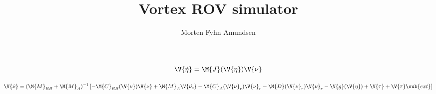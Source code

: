 \documentclass[a4paper]{article}
\title{Vortex ROV simulator}
\author{Morten Fyhn Amundsen}
\begin{document}
\maketitle

\begin{equation}
	\V{\dot{\eta}}
	=
	\M{J}(\V{\eta})
	\V{\nu}
\end{equation}

\begin{equation}
	\V{\dot{\nu}}
	=
	(\M{M}_{RB} + \M{M}_A)^{-1}
	\left[
		-
		\M{C}_{RB}(\V{\nu})\V{\nu}
		+
		\M{M}_A \V{\dot{\nu_c}}
		-
		\M{C}_A(\V{\nu}_r)\V{\nu}_r
		-
		\M{D}(\V{\nu}_r)\V{\nu}_r
		-
		\V{g}(\V{\eta})
		+
		\V{\tau}
		+
		\V{\tau}\sub{ext}
	\right]
\end{equation}
\end{document}
